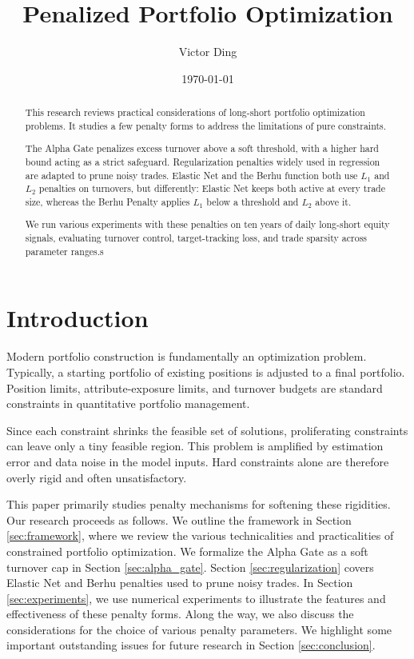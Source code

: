 \documentclass[11pt, letterpaper]{article}
\title{Penalized Portfolio Optimization}
\author{Victor Ding}
\affil{New Canaan High School}
\date{\today}
\begin{document}
\maketitle
\thispagestyle{empty}
\newpage

\begin{abstract}
  \thispagestyle{empty}
  \noindent
This research reviews practical considerations of long-short portfolio optimization problems. It studies a few penalty forms to
address the limitations of pure constraints.

The Alpha Gate penalizes excess turnover above a soft threshold, with a higher hard bound acting as a strict
safeguard. Regularization penalties widely used in regression are adapted to prune noisy trades. Elastic Net and the Berhu
function both use \(L_1\) and \(L_2\) penalties on turnovers, but differently: Elastic Net keeps both active at every trade
size, whereas the Berhu Penalty applies \(L_1\) below a threshold and \(L_2\) above it.

We run various experiments with these penalties on ten years of daily long-short equity signals, evaluating turnover control,
target-tracking loss, and trade sparsity across parameter ranges.s
\end{abstract}

\newpage
\pagestyle{myright}
\setcounter{page}{1}

\section{Introduction}
Modern portfolio construction is fundamentally an optimization problem. Typically, a starting portfolio of existing positions is
adjusted to a final portfolio. Position limits, attribute-exposure limits, and turnover budgets are standard constraints in
quantitative portfolio management.

Since each constraint shrinks the feasible set of solutions, proliferating constraints can leave only a tiny feasible
region. This problem is amplified by estimation error and data noise in the model inputs. Hard constraints alone are therefore
overly rigid and often unsatisfactory.

This paper primarily studies penalty mechanisms for softening these rigidities. Our research proceeds as follows. We outline the
framework in Section \ref{sec:framework}, where we review the various technicalities and practicalities of
constrained portfolio optimization. We formalize the Alpha Gate as a soft turnover cap in Section \ref{sec:alpha_gate}.  Section
\ref{sec:regularization} covers Elastic Net and Berhu penalties used to prune noisy trades. In Section \ref{sec:experiments},
we use numerical experiments to illustrate the features and effectiveness of these penalty forms. Along the way, we
also discuss the considerations for the choice of various penalty parameters. We highlight some important outstanding issues for
future research in Section \ref{sec:conclusion}.
\end{document}
